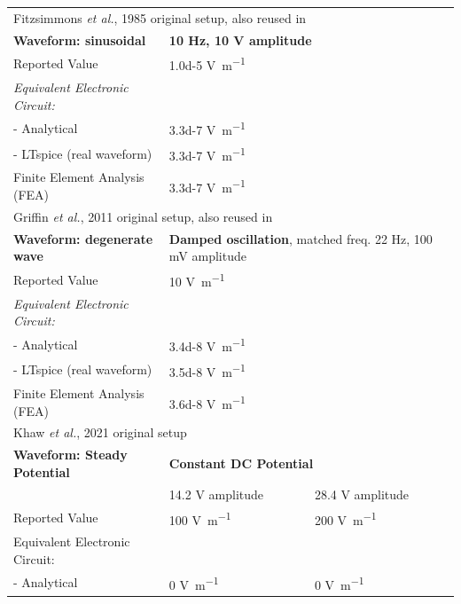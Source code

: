 \begin{table}
\begin{tabularx}{405px}{l l l l}
\multicolumn{4}{l}{Fitzsimmons \textit{et al.}, 1985 \cite{Fitzsimmons1986-ks} original setup, also reused in \cite{Fitzsimmons1989-zj, Fitzsimmons1992-vw}}\\ \cmidrule(l){1-4}
\textbf{Waveform: sinusoidal} &\multicolumn{3}{l}{\textbf{10 \si{\hertz}, 10 \si{\volt} amplitude}} \\
Reported Value &\multicolumn{3}{l}{\num{1.0d-5} \si{\volt\per\meter}} \\
\textit{Equivalent Electronic Circuit:} &\multicolumn{3}{l}{} \\
- Analytical &\multicolumn{3}{l}{\num{3.3d-7} \si{\volt\per\meter}} \\
- LTspice (real waveform) &\multicolumn{3}{l}{\num{3.3d-7} \si{\volt\per\meter}} \\
Finite Element Analysis (FEA) &\multicolumn{3}{l}{\num{3.3d-7} \si{\volt\per\meter}} \\ \cmidrule(l){1-4}


\multicolumn{4}{l}{Griffin \textit{et al.}, 2011 \cite{Griffin2011-bb} original setup, also reused in \cite{Griffin2013-wp}}\\ \cmidrule(l){1-4}
\textbf{Waveform: degenerate wave} &\multicolumn{3}{l}{\textbf{Damped oscillation}, matched freq. 22 \si{\hertz}, 100 \si{\milli\volt} amplitude} \\
Reported Value &\multicolumn{3}{l}{\num{10} \si{\volt\per\meter}} \\
\textit{Equivalent Electronic Circuit:} &\multicolumn{3}{l}{} \\
- Analytical &\multicolumn{3}{l}{\num{3.4d-8} \si{\volt\per\meter}} \\
- LTspice (real waveform) &\multicolumn{3}{l}{\num{3.5d-8} \si{\volt\per\meter}} \\
Finite Element Analysis (FEA) &\multicolumn{3}{l}{\num{3.6d-8} \si{\volt\per\meter}} \\ \cmidrule(l){1-4}

\multicolumn{4}{l}{Khaw \textit{et al.}, 2021 \cite{Khaw2021-tv} original setup}\\ \cmidrule(l){1-4}
\textbf{Waveform: Steady Potential} &\multicolumn{3}{l}{\textbf{Constant DC Potential}} \\
&\multicolumn{2}{l}{14.2 \si{\volt} amplitude} & 28.4 \si{\volt} amplitude \\  
Reported Value &\multicolumn{2}{l}{\num{100} \si{\volt\per\meter}} & \num{200} \si{\volt\per\meter} \\
Equivalent Electronic Circuit: &\multicolumn{2}{l}{} & \\
- Analytical &\multicolumn{2}{l}{\num{0} \si{\volt\per\meter}} & \num{0} \si{\volt\per\meter} \\ \bottomrule[0.15em]
\end{tabularx}
\label{tab_disagree}
\end{table}


